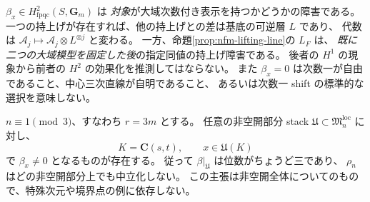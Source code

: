 \begin{remark}[対象の障害と同値の障害]
$\beta_x\in H^2_{\mathrm{fpqc}}(S,\mathbf G_m)$ は
\emph{対象}が大域次数付き表示を持つかどうかの障害である。
一つの持上げが存在すれば、他の持上げとの差は基底の可逆層 $L$ であり、
代数は $\mathcal A_j\mapsto\mathcal A_j\otimes L^{\otimes j}$ と変わる。
一方、命題\ref{prop:nfm-lifting-line}の $L_F$ は、
\emph{既に二つの大域模型を固定した後}の指定同値の持上げ障害である。
後者の $H^1$ の現象から前者の $H^2$ の効果化を推測してはならない。
また $\beta_x=0$ は次数一が自由であること、中心三次直線が自明であること、
あるいは次数一 shift の標準的な選択を意味しない。
\end{remark}

\begin{theorem}[三捩れ障害はどの非空開でも消えない]
\label{thm:nfm-brauer-dense-open}
$n\equiv1\pmod3$、すなわち $r=3m$ とする。
任意の非空開部分 stack
$\mathfrak U\subset\mathfrak M_n^{\mathrm{loc}}$ に対し、
\[
 K=\mathbf C(s,t),\qquad x\in\mathfrak U(K)
\]
で $\beta_x\ne0$ となるものが存在する。
従って $\beta|_{\mathfrak U}$ は位数がちょうど三であり、
$\rho_n$ はどの非空開部分上でも中立化しない。
この主張は非空開全体についてのもので、特殊次元や境界点の例に依存しない。
\end{theorem}

